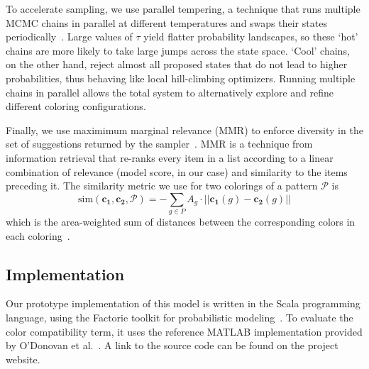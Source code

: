 To accelerate sampling, we use parallel tempering, a technique that runs multiple MCMC chains in parallel at different temperatures and swaps their states periodically~\cite{ParallelTempering}. Large values of $\tau$ yield flatter probability landscapes, so these `hot' chains are more likely to take large jumps across the state space. `Cool' chains, on the other hand, reject almost all proposed states that do not lead to higher probabilities, thus behaving like local hill-climbing optimizers. Running multiple chains in parallel allows the total system to alternatively explore and refine different coloring configurations.

Finally, we use maximimum marginal relevance (MMR) to enforce diversity in the set of suggestions returned by the sampler~\cite{MMR}. MMR is a technique from information retrieval that re-ranks every item in a list according to a linear combination of relevance (model score, in our case) and similarity to the items preceding it. The similarity metric we use for two colorings of a pattern $\mathcal{P}$ is
\begin{equation*}
\text{sim}(\mathbf{c_1}, \mathbf{c_2}, \mathcal{P}) = - \sum_{g \in P} {A_g \cdot ||\mathbf{c_1}(g) - \mathbf{c_2}(g)||}
\end{equation*}
which is the area-weighted sum of \lab distances between the corresponding colors in each coloring~.

\subsection{Implementation}
\label{sec:implementation}

Our prototype implementation of this model is written in the Scala programming language, using the Factorie toolkit for probabilistic modeling~\cite{Factorie}. To evaluate the color compatibility term, it uses the reference MATLAB implementation provided by O'Donovan et al.~. A link to the source code can be found on the project website.